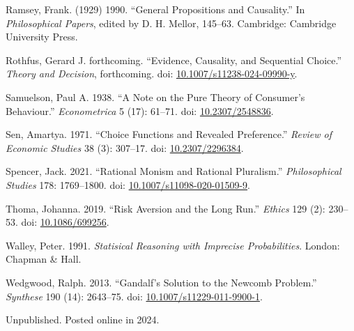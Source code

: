 \documentclass[
  11pt,
  letterpaper,
  DIV=11,
  numbers=noendperiod,
  twoside]{scrartcl}
\newlength{\cslhangindent}
\newenvironment{CSLReferences}[2] %
 {\begin{list}{}{%
  \setlength{\itemindent}{0pt}
  \setlength{\leftmargin}{0pt}
  \setlength{\parsep}{0pt}
  \ifodd #1
   \setlength{\leftmargin}{\cslhangindent}
   \setlength{\itemindent}{-1\cslhangindent}
  \fi
  \setlength{\itemsep}{#2\baselineskip}}}
 {\end{list}}
\begin{document}
\begin{CSLReferences}{1}{0}
Ramsey, Frank. (1929) 1990. {``General Propositions and Causality.''} In
\emph{Philosophical Papers}, edited by D. H. Mellor, 145--63. Cambridge:
Cambridge University Press.

Rothfus, Gerard J. forthcoming. {``Evidence, Causality, and Sequential
Choice.''} \emph{Theory and Decision}, forthcoming. doi:
\href{https://doi.org/10.1007/s11238-024-09990-y}{10.1007/s11238-024-09990-y}.

Samuelson, Paul A. 1938. {``A Note on the Pure Theory of Consumer's
Behaviour.''} \emph{Econometrica} 5 (17): 61--71. doi:
\href{https://doi.org/10.2307/2548836}{10.2307/2548836}.

Sen, Amartya. 1971. {``Choice Functions and Revealed Preference.''}
\emph{Review of Economic Studies} 38 (3): 307--17. doi:
\href{https://doi.org/10.2307/2296384}{10.2307/2296384}.

Spencer, Jack. 2021. {``Rational Monism and Rational Pluralism.''}
\emph{Philosophical Studies} 178: 1769--1800. doi:
\href{https://doi.org/10.1007/s11098-020-01509-9}{10.1007/s11098-020-01509-9}.

Thoma, Johanna. 2019. {``Risk Aversion and the Long Run.''}
\emph{Ethics} 129 (2): 230--53. doi:
\href{https://doi.org/10.1086/699256}{10.1086/699256}.

Walley, Peter. 1991. \emph{Statisical Reasoning with Imprecise
Probabilities}. London: Chapman \& Hall.

Wedgwood, Ralph. 2013. {``Gandalf's Solution to the Newcomb Problem.''}
\emph{Synthese} 190 (14): 2643--75. doi:
\href{https://doi.org/10.1007/s11229-011-9900-1}{10.1007/s11229-011-9900-1}.

\end{CSLReferences}



\noindent Unpublished. Posted online in 2024.
\end{document}
